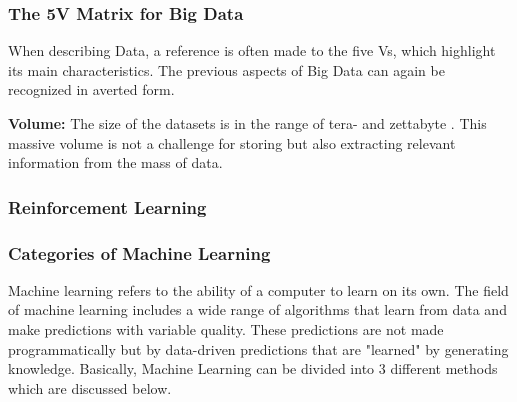 \subsubsection{The 5V Matrix for Big Data}
When describing Data, a reference is often made to the five Vs,
which highlight its main characteristics.
The previous aspects of Big Data can again be recognized in averted form. 

\textbf{Volume:} The size of the datasets is in the range of tera- and zettabyte
. This massive volume is not a challenge for storing but also extracting
relevant information from the mass of data. 

\subsubsection{Reinforcement Learning}

\subsubsection{Categories of Machine Learning}

Machine learning refers to the ability of a computer to learn on its own.
The field of machine learning includes a wide range of algorithms that learn
from data and make predictions with variable quality.
These predictions are not made programmatically but by data-driven predictions
that are "learned" by generating knowledge. Basically,
Machine Learning can be divided into 3 different methods which are discussed below.\cite[4]{2018VDMAQuick}


